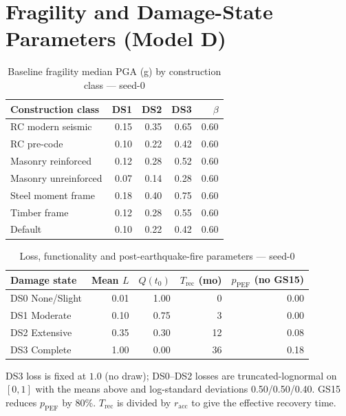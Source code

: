 \documentclass[11pt,a4paper]{article}
\begin{document}
\section{Fragility and Damage-State Parameters (Model D)}\label{app:frag}

\begin{table}[H]
  \centering
  \caption{Baseline fragility median PGA (g) by construction class --- seed-0}
  \begin{tabular}{lrrrr}
    \toprule
    \textbf{Construction class} & \textbf{DS1} & \textbf{DS2} & \textbf{DS3} &
    \textbf{$\beta$} \\
    \midrule
    RC modern seismic   & 0.15 & 0.35 & 0.65 & 0.60 \\
    RC pre-code         & 0.10 & 0.22 & 0.42 & 0.60 \\
    Masonry reinforced  & 0.12 & 0.28 & 0.52 & 0.60 \\
    Masonry unreinforced& 0.07 & 0.14 & 0.28 & 0.60 \\
    Steel moment frame  & 0.18 & 0.40 & 0.75 & 0.60 \\
    Timber frame        & 0.12 & 0.28 & 0.55 & 0.60 \\
    Default             & 0.10 & 0.22 & 0.42 & 0.60 \\
    \bottomrule
  \end{tabular}
\end{table}

\begin{table}[H]
  \centering
  \caption{Loss, functionality and post-earthquake-fire parameters --- seed-0}
  \begin{tabular}{lrrrr}
    \toprule
    \textbf{Damage state} & \textbf{Mean $L$} & \textbf{$Q(t_0)$} &
    \textbf{$T_{\text{rec}}$ (mo)} & \textbf{$p_{\text{PEF}}$ (no GS15)} \\
    \midrule
    DS0 None/Slight  & 0.01 & 1.00 & 0  & 0.00 \\
    DS1 Moderate     & 0.10 & 0.75 & 3  & 0.00 \\
    DS2 Extensive    & 0.35 & 0.30 & 12 & 0.08 \\
    DS3 Complete     & 1.00 & 0.00 & 36 & 0.18 \\
    \bottomrule
  \end{tabular}
\end{table}

DS3 loss is fixed at $1.0$ (no draw); DS0--DS2 losses are truncated-lognormal on
$[0,1]$ with the means above and log-standard deviations 0.50/0.50/0.40. GS15
reduces $p_{\text{PEF}}$ by 80\%. $T_{\text{rec}}$ is divided by
$r_{\text{acc}}$ to give the effective recovery time.
\end{document}
